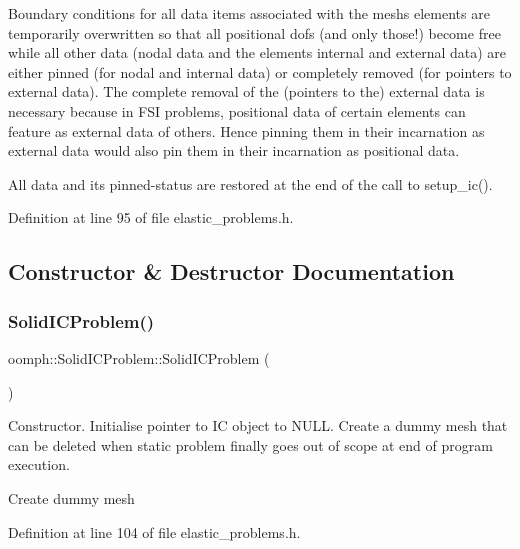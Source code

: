 Boundary conditions for all data items associated with the mesh\textquotesingle{}s elements\textquotesingle{} are temporarily overwritten so that all positional dofs (and only those!) become free while all other data (nodal data and the element\textquotesingle{}s internal and external data) are either pinned (for nodal and internal data) or completely removed (for pointers to external data). The complete removal of the (pointers to the) external data is necessary because in F\+SI problems, positional data of certain elements can feature as external data of others. Hence pinning them in their incarnation as external data would also pin them in their incarnation as positional data.

All data and its pinned-\/status are restored at the end of the call to setup\+\_\+ic(). 

Definition at line 95 of file elastic\+\_\+problems.\+h.



\subsection{Constructor \& Destructor Documentation}
\mbox{\label{classoomph_1_1SolidICProblem_ae1dd84a4e5df9eb444dd82531847ab79}} 
\subsubsection{\texorpdfstring{Solid\+I\+C\+Problem()}{SolidICProblem()}\hspace{0.1cm}{\footnotesize\ttfamily [1/2]}}
{\footnotesize\ttfamily oomph\+::\+Solid\+I\+C\+Problem\+::\+Solid\+I\+C\+Problem (\begin{DoxyParamCaption}{ }\end{DoxyParamCaption})\hspace{0.3cm}{\ttfamily [inline]}}



Constructor. Initialise pointer to IC object to N\+U\+LL. Create a dummy mesh that can be deleted when static problem finally goes out of scope at end of program execution. 

Create dummy mesh 

Definition at line 104 of file elastic\+\_\+problems.\+h.



